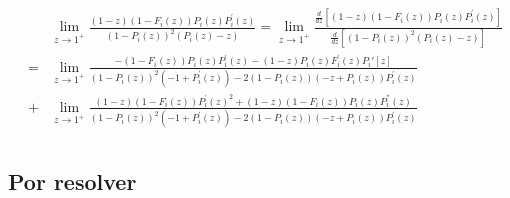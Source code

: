\begin{eqnarray*}
&&\lim_{z\rightarrow1^{+}}\frac{\left(1-z\right)\left(1-F_{i}\left(z\right)\right)P_{i}\left(z\right)P_{i}^{'}\left(z\right)}{\left(1-P_{i}\left(z\right)\right)^{2}\left(P_{i}\left(z\right)-z\right)}=\lim_{z\rightarrow1^{+}}\frac{\frac{d}{dz}\left[\left(1-z\right)\left(1-F_{i}\left(z\right)\right)P_{i}\left(z\right)P_{i}^{'}\left(z\right)\right]}{\frac{d}{dz}\left[\left(1-P_{i}\left(z\right)\right)^{2}\left(P_{i}\left(z\right)-z\right)\right]}\\
&=&\lim_{z\rightarrow1^{+}}\frac{-\left(1-F_{i}\left(z\right)\right) P_{i}\left(z\right) P_{i}^{'}\left(z\right)-(1-z) P_{i}\left(z\right) F_{i}^{'}\left(z\right)P_i'[z]}{\left(1-P_{i}\left(z\right)\right)^2 \left(-1+P_{i}^{'}\left(z\right)\right)-2 \left(1-P_{i}\left(z\right)\right) \left(-z+P_{i}\left(z\right)\right) P_{i}^{'}\left(z\right)}\\
&+&\lim_{z\rightarrow1^{+}}\frac{(1-z) \left(1-F_{i}\left(z\right)\right) P_{i}^{'}\left(z\right)^2+(1-z) \left(1-F_{i}\left(z\right)\right) P_{i}\left(z\right) P_{i}^{''}\left(z\right)}{\left(1-P_{i}\left(z\right)\right)^2 \left(-1+P_{i}^{'}\left(z\right)\right)-2 \left(1-P_{i}\left(z\right)\right) \left(-z+P_{i}\left(z\right)\right) P_{i}^{'}\left(z\right)}\\
\end{eqnarray*}

\subsection{Por resolver}



